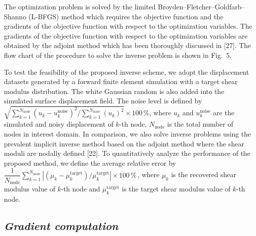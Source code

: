 \documentclass[11pt]{article}
\begin{document}
\noindent
The optimization problem is solved by the limited
Broyden--Fletcher--Goldfarb--Shanno (L-BFGS) method which requires
the objective function and the gradients of the objective function
with respect to the optimization variables. The gradients of the
objective function with respect to the optimization variables are
obtained by the adjoint method which has been thoroughly discussed
in [27]. The flow chart of the procedure to solve the inverse
problem is shown in Fig.~5.

To test the feasibility of the proposed inverse scheme, we adopt the
displacement datasets generated by a forward finite element
simulation with a target shear modulus distribution. The white
Gaussian random is also added into the simulated surface displacement
field. The noise level is defined by
$\sqrt{\displaystyle\sum_{k=1}^{N_{\text{node}}}
\left(u_k - u_k^{\text{noise}}\right)^{\!2}\bigg/
\sum_{k=1}^{N_{\text{node}}} (u_k)^{2}} \times 100\,\%$,
where $u_k$ and $u_k^{\text{noise}}$ are the simulated and noisy
displacement of $k$-th node, $N_{\text{node}}$ is the total number of
nodes in interest domain. In comparison, we also solve inverse
problems using the prevalent implicit inverse method based on the
adjoint method where the shear moduli are nodally defined [22]. To
quantitatively analyze the performance of the proposed method, we
define the average relative error by
$\dfrac{1}{N_{\text{node}}}
\displaystyle\sum_{k=1}^{N_{\text{node}}}
\left|\left(\mu_k - \mu_k^{\text{target}}\right)
\big/ \mu_k^{\text{target}}\right| \times 100\,\%$\,,
where $\mu_k$ is the recovered shear modulus value of $k$-th node
and $\mu_k^{\text{target}}$ is the target shear modulus value of
$k$-th node.

\subsection*{\textit{Gradient computation}}
\end{document}
